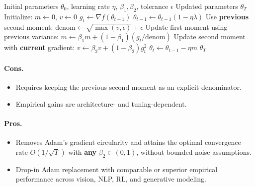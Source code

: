 \begin{algorithm}[H]
\caption{ADOPT (Adam with Optimal Pruned Tuning)}
\label{alg:adopt}
\begin{algorithmic}[1]
\Require Initial parameters $\theta_0$, learning rate $\eta$, $\beta_1, \beta_2$, tolerance $\epsilon$
\Ensure Updated parameters $\theta_T$
\State Initialize: $m \gets 0$, $v \gets 0$
    \State $g_t \gets \nabla f(\theta_{t-1})$
        \State $\theta_{t-1} \gets \theta_{t-1}(1 - \eta\lambda)$
    \EndIf
    \State Use \textbf{previous} second moment: $\text{denom} \gets \sqrt{\max(v, \epsilon)} + \epsilon$
    \State Update first moment using previous variance: $m \gets \beta_1 m + (1-\beta_1)(g_t / \text{denom})$
    \State Update second moment with \textbf{current} gradient: $v \gets \beta_2 v + (1-\beta_2) g_t^2$
    \State $\theta_t \gets \theta_{t-1} - \eta m$
\EndFor
\Return $\theta_T$
\end{algorithmic}
\end{algorithm}

\paragraph{Cons.}
\begin{itemize}[leftmargin=*]
\item Requires keeping the previous second moment as an explicit denominator.
\item Empirical gains are architecture- and tuning-dependent.
\end{itemize}

\paragraph{Pros.}
\begin{itemize}[leftmargin=*]
\item Removes Adam's gradient circularity and attains the optimal convergence rate $O(1/\sqrt{T})$ with \textbf{any} $\beta_2 \in (0,1)$, without bounded-noise assumptions.
\item Drop-in Adam replacement with comparable or superior empirical performance across vision, NLP, RL, and generative modeling.
\end{itemize}


